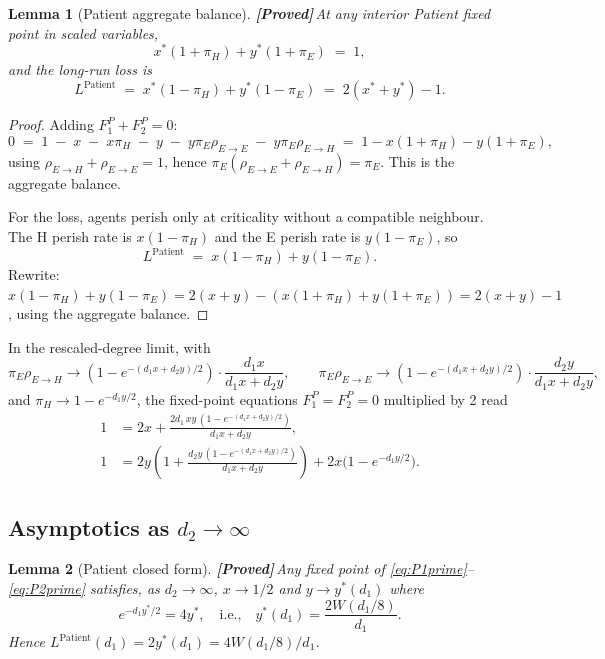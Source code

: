 \documentclass{article}
\theoremstyle{plain}
\newtheorem{lemma}{Lemma}
\theoremstyle{definition}
\newcommand{\proved}{\textcolor{provedgreen}{\textbf{[Proved]}}\,}
\begin{document}
\begin{lemma}[Patient aggregate balance]\label{lem:patient-aggreg}
\proved At any interior Patient fixed point in scaled variables,
\[
x^\ast(1+\pi_H)+y^\ast(1+\pi_E)\;=\;1,
\]
and the long-run loss is
\[
L^{\text{Patient}}\;=\;x^\ast(1-\pi_H)+y^\ast(1-\pi_E)\;=\;2(x^\ast+y^\ast)-1.
\]
\end{lemma}

\begin{proof}
Adding $F_1^P+F_2^P=0$:
\[
0\;=\;1\;-\;x\;-\;x\pi_H\;-\;y\;-\;y\pi_E\rho_{E\to E}\;-\;y\pi_E\rho_{E\to H}\;=\;1-x(1+\pi_H)-y(1+\pi_E),
\]
using $\rho_{E\to H}+\rho_{E\to E}=1$, hence $\pi_E(\rho_{E\to E}+\rho_{E\to H})=\pi_E$. This is the aggregate balance.

For the loss, agents perish only at criticality without a compatible neighbour. The H perish rate is $x(1-\pi_H)$ and the E perish rate is $y(1-\pi_E)$, so
\[
L^{\text{Patient}}\;=\;x(1-\pi_H)+y(1-\pi_E).
\]
Rewrite: $x(1-\pi_H)+y(1-\pi_E)=2(x+y)-(x(1+\pi_H)+y(1+\pi_E))=2(x+y)-1$, using the aggregate balance.
\end{proof}

In the rescaled-degree limit, with
\[
\pi_E\rho_{E\to H}\to (1-e^{-(d_1 x+d_2 y)/2})\cdot\frac{d_1 x}{d_1 x+d_2 y},\qquad \pi_E\rho_{E\to E}\to(1-e^{-(d_1 x+d_2 y)/2})\cdot\frac{d_2 y}{d_1 x+d_2 y},
\]
and $\pi_H\to 1-e^{-d_1 y/2}$, the fixed-point equations $F_1^P=F_2^P=0$ multiplied by 2 read
\begin{align}
1 &= 2x+\frac{2 d_1\, xy\,(1-e^{-(d_1 x+d_2 y)/2})}{d_1 x+d_2 y}, \tag{$P_1'$}\label{eq:P1prime}\\
1 &= 2y\!\left(1+\frac{d_2 y\,(1-e^{-(d_1 x+d_2 y)/2})}{d_1 x+d_2 y}\right)+2x\bigl(1-e^{-d_1 y/2}\bigr). \tag{$P_2'$}\label{eq:P2prime}
\end{align}

\subsection{Asymptotics as $d_2\to\infty$}\label{ssec:patient-d2}

\begin{lemma}[Patient closed form]\label{lem:Patient}
\proved Any fixed point of \eqref{eq:P1prime}--\eqref{eq:P2prime} satisfies, as $d_2\to\infty$, $x\to 1/2$ and $y\to y^\ast(d_1)$ where
\[
e^{-d_1 y^\ast/2}=4y^\ast,\quad\text{i.e.,}\quad y^\ast(d_1)=\frac{2W(d_1/8)}{d_1}.
\]
Hence $L^{\text{Patient}}(d_1)=2y^\ast(d_1)=4W(d_1/8)/d_1$.
\end{lemma}
\end{document}
